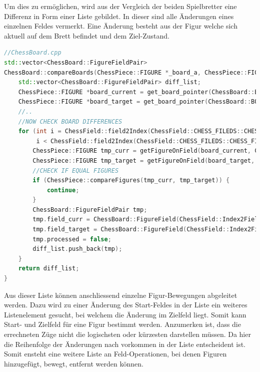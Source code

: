 Um dies zu ermöglichen, wird aus der Vergleich der beiden Spielbretter
eine Differenz in Form einer Liste gebildet. In dieser sind alle
Änderungen eines einzelnen Feldes vermerkt. Eine Änderung besteht aus
der Figur welche sich aktuell auf dem Brett befindet und dem
Ziel-Zustand.

\begin{lstlisting}[language={C++}]
//ChessBoard.cpp
std::vector<ChessBoard::FigureFieldPair>
ChessBoard::compareBoards(ChessPiece::FIGURE *_board_a, ChessPiece::FIGURE *_board_b, bool _include_park_pos) {
    std::vector<ChessBoard::FigureFieldPair> diff_list;
    ChessPiece::FIGURE *board_current = get_board_pointer(ChessBoard::BOARD_TPYE::REAL_BOARD);
    ChessPiece::FIGURE *board_target = get_board_pointer(ChessBoard::BOARD_TPYE::TARGET_BOARD);
    //..
    //NOW CHECK BOARD DIFFERENCES
    for (int i = ChessField::field2Index(ChessField::CHESS_FILEDS::CHESS_FIELD_A1);
         i < ChessField::field2Index(ChessField::CHESS_FILEDS::CHESS_FIELD_PARK_POSTION_WHITE_1); i++) {
        ChessPiece::FIGURE tmp_curr = getFigureOnField(board_current, ChessField::Index2Field(i));
        ChessPiece::FIGURE tmp_target = getFigureOnField(board_target, ChessField::Index2Field(i));
        //CHECK IF EQUAL FIGURES
        if (ChessPiece::compareFigures(tmp_curr, tmp_target)) {
            continue;
        }
        ChessBoard::FigureFieldPair tmp;
        tmp.field_curr = ChessBoard::FigureField(ChessField::Index2Field(i), tmp_curr);
        tmp.field_target = ChessBoard::FigureField(ChessField::Index2Field(i), tmp_target);
        tmp.processed = false;
        diff_list.push_back(tmp);
    }
    return diff_list;
}
\end{lstlisting}

Aus dieser Liste können anschliessend einzelne Figur-Bewegungen
abgeleitet werden. Dazu wird zu einer Änderung des Start-Feldes in der
Liste ein weiteres Listenelement gesucht, bei welchem die Änderung im
Zielfeld liegt. Somit kann Start- und Zielfeld für eine Figur bestimmt
werden. Anzumerken ist, dass die errechneten Züge nicht die logischsten
oder kürzesten darstellen müssen. Da hier die Reihenfolge der Änderungen
nach vorkommen in der Liste entscheident ist. Somit ensteht eine weitere
Liste an Feld-Operationen, bei denen Figuren hinzugefügt, bewegt,
entfernt werden können.

